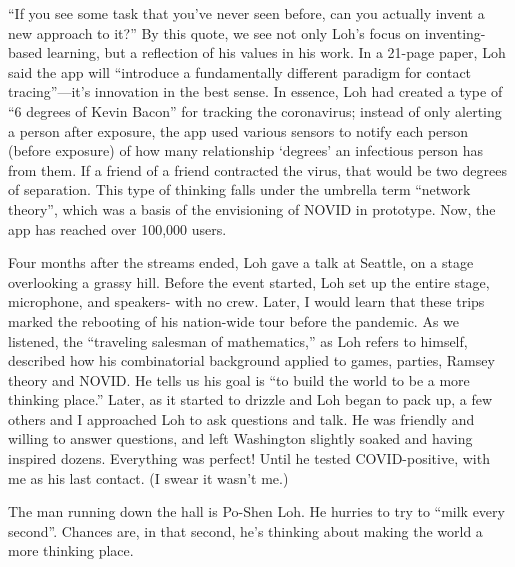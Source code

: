 \documentclass{article}
\begin{document}
“If you see some task that you’ve never seen before, can you actually invent a new approach to it?” By this quote, we see not only Loh’s focus on inventing-based learning, but a reflection of his values in his work. In a 21-page paper, Loh said the app will “introduce a fundamentally different paradigm for contact tracing”---it’s innovation in the best sense. In essence, Loh had created a type of “6 degrees of Kevin Bacon” for tracking the coronavirus; instead of only alerting a person after exposure, the app used various sensors to notify each person (before exposure) of how many relationship ‘degrees’ an infectious person has from them. If a friend of a friend contracted the virus, that would be two degrees of separation. This type of thinking falls under the umbrella term “network theory”, which was a basis of the envisioning of NOVID in prototype. Now, the app has reached over 100,000 users.

Four months after the streams ended, Loh gave a talk at Seattle, on a stage overlooking a grassy hill. Before the event started, Loh set up the entire stage, microphone, and speakers- with no crew. Later, I would learn that these trips marked the rebooting of his nation-wide tour before the pandemic. As we listened, the “traveling salesman of mathematics,” as Loh refers to himself, described how his combinatorial background applied to games, parties, Ramsey theory and NOVID. He tells us his goal is “to build the world to be a more thinking place.” Later, as it started to drizzle and Loh began to pack up, a few others and I approached Loh to ask questions and talk. He was friendly and willing to answer questions, and left Washington slightly soaked and having inspired dozens. Everything was perfect! Until he tested COVID-positive, with me as his last contact. (I swear it wasn’t me.)

The man running down the hall is Po-Shen Loh. He hurries to try to “milk every second”. Chances are, in that second, he’s thinking about making the world a more thinking place.
\end{document}
